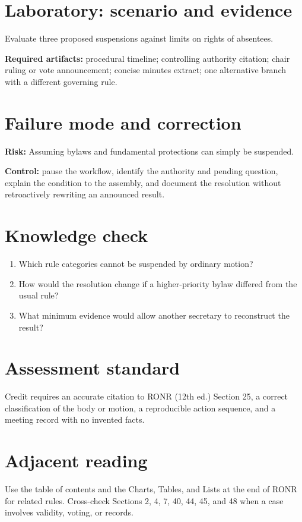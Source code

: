 \documentclass[11pt]{article}
\begin{document}
\section{Laboratory: scenario and evidence}
Evaluate three proposed suspensions against limits on rights of absentees.

\textbf{Required artifacts:} procedural timeline; controlling authority citation; chair ruling or vote announcement; concise minutes extract; one alternative branch with a different governing rule.

\section{Failure mode and correction}
\textbf{Risk:} Assuming bylaws and fundamental protections can simply be suspended.

\textbf{Control:} pause the workflow, identify the authority and pending question, explain the condition to the assembly, and document the resolution without retroactively rewriting an announced result.

\section{Knowledge check}
\begin{enumerate}[leftmargin=*,itemsep=4pt]
\item Which rule categories cannot be suspended by ordinary motion?
\item How would the resolution change if a higher-priority bylaw differed from the usual rule?
\item What minimum evidence would allow another secretary to reconstruct the result?
\end{enumerate}

\section{Assessment standard}
Credit requires an accurate citation to RONR (12th ed.) Section 25, a correct classification of the body or motion, a reproducible action sequence, and a meeting record with no invented facts.

\section{Adjacent reading}
Use the table of contents and the Charts, Tables, and Lists at the end of RONR for related rules. Cross-check Sections 2, 4, 7, 40, 44, 45, and 48 when a case involves validity, voting, or records.
\end{document}

